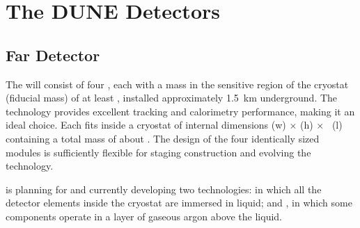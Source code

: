 \section{The DUNE Detectors}




\subsection{Far Detector}
\label{ch:dune-det-tech-ov-fd}

The \fdfiducialmass {}  will consist of four  , each with a  mass in the sensitive region of the cryostat (fiducial mass) of at least \nominalmodsize, installed approximately \SI{1.5}{km} underground. The  technology provides
excellent tracking and calorimetry performance, making it an ideal 
choice. Each  fits inside a cryostat of internal dimensions
\cryostatwdthinner (w) $\times$ \cryostathtinner (h) $\times$ \cryostatleninner~(l) containing a total  mass of about \larmass{}.
 The design of the four identically sized modules is sufficiently flexible for staging construction and evolving the  technology.

 is planning for and currently developing two  technologies:  in which all the detector elements inside the cryostat are immersed in liquid; and , in which some components operate in a layer of gaseous argon above the liquid.

